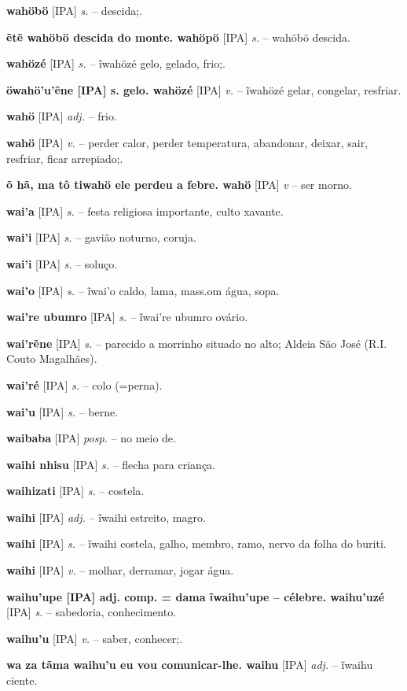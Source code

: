 \textbf{wahöbö} [IPA] \textit{s.} -- descida;.

\textbf{ẽtẽ wahöbö descida do monte. wahöpö} [IPA] \textit{s.} -- wahöbö descida.

\textbf{wahözé} [IPA] \textit{s.} -- ĩwahözé gelo, gelado, frio;.

\textbf{öwahö'u'ẽne [IPA] s. gelo. wahözé} [IPA] \textit{v.} -- ĩwahözé gelar, congelar, resfriar.

\textbf{wahö} [IPA] \textit{adj.} -- frio.

\textbf{wahö} [IPA] \textit{v.} -- perder calor, perder temperatura, abandonar, deixar, sair, resfriar, ficar arrepiado;.

\textbf{õ hã, ma tô tiwahö ele perdeu a febre. wahö} [IPA] \textit{v} -- {ser morno}.

\textbf{wai'a} [IPA] \textit{s.} -- festa religiosa importante, culto xavante.

\textbf{wai'i} [IPA] \textit{s.} -- gavião noturno, coruja.

\textbf{wai'i} [IPA] \textit{s.} -- soluço.

\textbf{wai'o} [IPA] \textit{s.} -- ĩwai'o caldo, lama, mass.om água, sopa.

\textbf{wai're ubumro} [IPA] \textit{s.} -- ĩwai're ubumro ovário.

\textbf{wai'rẽne} [IPA] \textit{s.} -- parecido a morrinho situado no alto; Aldeia São José (R.I. Couto Magalhães).

\textbf{wai'ré} [IPA] \textit{s.} -- colo (=perna).

\textbf{wai'u} [IPA] \textit{s.} -- berne.

\textbf{waibaba} [IPA] \textit{posp.} -- no meio de.

\textbf{waihi nhisu} [IPA] \textit{s.} -- flecha para criança.

\textbf{waihizati} [IPA] \textit{s.} -- costela.

\textbf{waihi} [IPA] \textit{adj.} -- ĩwaihi estreito, magro.

\textbf{waihi} [IPA] \textit{s.} -- ĩwaihi costela, galho, membro, ramo, nervo da folha do buriti.

\textbf{waihi} [IPA] \textit{v.} -- molhar, derramar, jogar água.

\textbf{waihu'upe [IPA] adj. comp. = dama ĩwaihu'upe -- célebre. waihu'uzé} [IPA] \textit{s.} -- sabedoria, conhecimento.

\textbf{waihu'u} [IPA] \textit{v.} -- saber, conhecer;.

\textbf{wa za tãma waihu'u eu vou comunicar-lhe. waihu} [IPA] \textit{adj.} -- ĩwaihu ciente.

